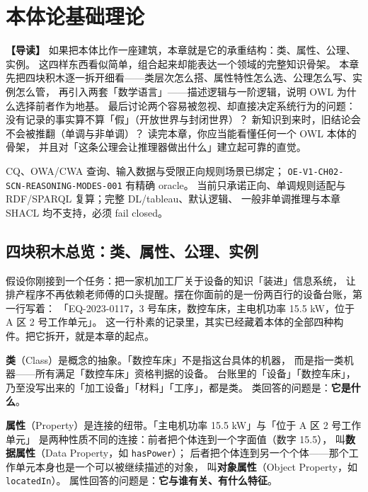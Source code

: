\chapter{本体论基础理论}

\begin{introbox}
\textbf{【导读】}
如果把本体比作一座建筑，本章就是它的承重结构：类、属性、公理、实例。
这四样东西看似简单，组合起来却能表达一个领域的完整知识骨架。
本章先把四块积木逐一拆开细看——类层次怎么搭、属性特性怎么选、公理怎么写、实例怎么管，
再引入两套「数学语言」——描述逻辑与一阶逻辑，说明 OWL 为什么选择前者作为地基。
最后讨论两个容易被忽视、却直接决定系统行为的问题：
没有记录的事实算不算「假」（开放世界与封闭世界）？
新知识到来时，旧结论会不会被推翻（单调与非单调）？
读完本章，你应当能看懂任何一个 OWL 本体的骨架，
并且对「这条公理会让推理器做出什么」建立起可靠的直觉。
\end{introbox}

{CQ、OWA/CWA 查询、输入数据与受限正向规则场景已绑定；
\texttt{OE-V1-CH02-SCN-REASONING-MODES-001} 有精确 oracle。}
{当前只承诺正向、单调规则适配与 RDF/SPARQL 复算；完整 DL/tableau、默认逻辑、
一般非单调推理与本章 SHACL 均不支持，必须 fail closed。}

\section{四块积木总览：类、属性、公理、实例}

假设你刚接到一个任务：把一家机加工厂关于设备的知识「装进」信息系统，
让排产程序不再依赖老师傅的口头提醒。摆在你面前的是一份两百行的设备台账，第一行写着：
「EQ-2023-0117，3 号车床，数控车床，主电机功率 15.5 kW，位于 A 区 2 号工作单元」。
这一行朴素的记录里，其实已经藏着本体的全部四种构件。把它拆开，就是本章的起点。

\textbf{类}（Class）是概念的抽象。「数控车床」不是指这台具体的机器，
而是指一类机器——所有满足「数控车床」资格判据的设备。
台账里的「设备」「数控车床」，乃至没写出来的「加工设备」「材料」「工序」，都是类。
类回答的问题是：\textbf{它是什么}。

\textbf{属性}（Property）是连接的纽带。「主电机功率 15.5 kW」与「位于 A 区 2 号工作单元」
是两种性质不同的连接：前者把个体连到一个字面值（数字 15.5），
叫\textbf{数据属性}（Data Property，如 \texttt{hasPower}）；
后者把个体连到另一个个体——那个工作单元本身也是一个可以被继续描述的对象，
叫\textbf{对象属性}（Object Property，如 \texttt{locatedIn}）。
属性回答的问题是：\textbf{它与谁有关、有什么特征}。

